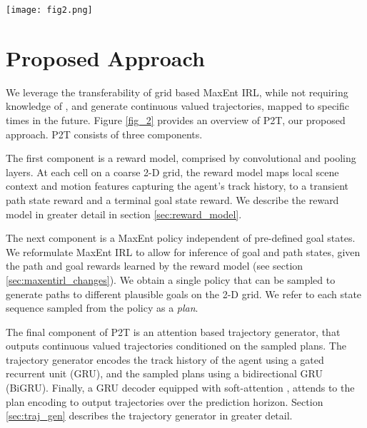 \documentclass[journal]{IEEEtran}
\begin{document}
\begin{figure*}[t]
\centering
\texttt{[image: fig2.png]}
\caption{\textbf{Overview}: P2T consists of three modules: (1) a fully convolutional reward model, that outputs transient path state rewards and terminal goal state rewards on a coarse 2-D grid, (2) a MaxEnt RL policy for the learned path and state rewards, that can be sampled to generate multimodal plans on the 2-D grid, and (3) an attention based trajectory generator, that outputs continuous valued trajectories conditioned on the sampled plans.}
\label{fig_2}
\end{figure*}























\section{Proposed Approach}
\label{sec:model}
We leverage the transferability of grid based MaxEnt IRL, while not requiring knowledge of , and generate continuous valued trajectories, mapped to specific times in the future. Figure \ref{fig_2} provides an overview of P2T, our proposed approach. P2T consists of three components. 

The first component is a reward model, comprised by convolutional and pooling layers. At each cell on a coarse 2-D grid, the reward model maps local scene context and motion features capturing the agent's track history, to a transient path state reward and a terminal goal state reward. We describe the reward model in greater detail in section \ref{sec:reward_model}. 

The next component is a MaxEnt policy independent of pre-defined goal states. We reformulate MaxEnt IRL to allow for inference of goal and path states, given the path and goal rewards learned by the reward model (see section \ref{sec:maxentirl_changes}). We obtain a single policy that can be sampled to generate paths to different plausible goals on the 2-D grid. We refer to each state sequence sampled from the policy as a \textit{plan}.

The final component of P2T is an attention based trajectory generator, that outputs continuous valued trajectories conditioned on the sampled plans. The trajectory generator encodes the track history of the agent using a gated recurrent unit (GRU), and the sampled plans using a bidirectional GRU (BiGRU). Finally, a GRU decoder equipped with soft-attention \cite{bahdanau2014neural}, attends to the plan encoding to output trajectories over the prediction horizon. Section \ref{sec:traj_gen} describes the trajectory generator in greater detail.  
\end{document}
